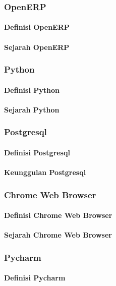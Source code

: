 \subsubsection{OpenERP}
\paragraph{Definisi OpenERP}
\paragraph{Sejarah OpenERP}
\subsubsection{Python}
\paragraph{Definisi Python}
\paragraph{Sejarah Python}
\subsubsection{Postgresql}
\paragraph{Definisi Postgresql}
\paragraph{Keunggulan Postgresql}
\subsubsection{Chrome Web Browser}
\paragraph{Definisi Chrome Web Browser}
\paragraph{Sejarah Chrome Web Browser}
\subsubsection{Pycharm}
\paragraph{Definisi Pycharm}

